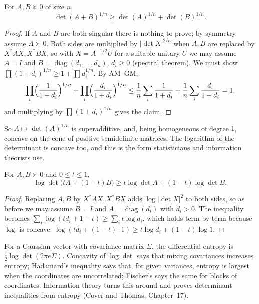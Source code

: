 \begin{theorem}\label{thm:minkowskidet}
For $A,B\succeq0$ of size $n$,
\[
\det(A+B)^{1/n}\ge\det(A)^{1/n}+\det(B)^{1/n}.
\]
\end{theorem}
\begin{proof}
If $A$ and $B$ are both singular there is nothing to prove; by symmetry assume $A\succ0$. Both sides are multiplied by $|\det X|^{2/n}$
when $A,B$ are replaced by $X^*AX,X^*BX$, so with $X=A^{-1/2}U$ for a suitable unitary $U$ we may assume $A=I$ and $B=\operatorname{diag}
(d_1,\dots,d_n)$, $d_i\ge0$ (spectral theorem). We must show $\prod(1+d_i)^{1/n}\ge1+\prod d_i^{1/n}$. By AM--GM,
\[
\prod_i\Bigl(\frac1{1+d_i}\Bigr)^{1/n}+\prod_i\Bigl(\frac{d_i}{1+d_i}\Bigr)^{1/n}\le\frac1n\sum_i\frac1{1+d_i}+\frac1n\sum_i\frac{d_i}{1+d_i}=1,
\]
and multiplying by $\prod(1+d_i)^{1/n}$ gives the claim.
\end{proof}

So $A\mapsto\det(A)^{1/n}$ is superadditive, and, being homogeneous of degree $1$, concave on the cone of positive semidefinite matrices.
The logarithm of the determinant is concave too, and this is the form statisticians and information theorists use.

\begin{theorem}\label{thm:logdet}
For $A,B\succ0$ and $0\le t\le1$,
\[
\log\det\bigl(tA+(1-t)B\bigr)\ge t\log\det A+(1-t)\log\det B.
\]
\end{theorem}
\begin{proof}
Replacing $A,B$ by $X^*AX,X^*BX$ adds $\log|\det X|^2$ to both sides, so as before we may assume $B=I$ and $A=\operatorname{diag}(d_i)$
with $d_i>0$. The inequality becomes $\sum_i\log(td_i+1-t)\ge\sum_it\log d_i$, which holds term by term because $\log$ is concave:
$\log(td_i+(1-t)\cdot1)\ge t\log d_i+(1-t)\log1$.
\end{proof}

\begin{remark}
For a Gaussian vector with covariance matrix $\Sigma$, the differential entropy is $\frac12\log\det(2\pi e\Sigma)$. Concavity of
$\log\det$ says that mixing covariances increases entropy; Hadamard's inequality says that, for given variances, entropy is largest
when the coordinates are uncorrelated; Fischer's says the same for blocks of coordinates. Information theory turns this around
and proves determinant inequalities from entropy (Cover and Thomas, Chapter~17).
\end{remark}


